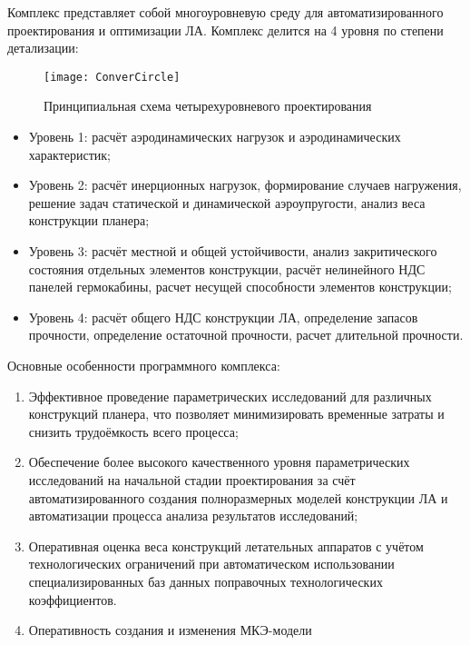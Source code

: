 \label{sec:Conver}


Комплекс представляет собой многоуровневую среду для автоматизированного проектирования и оптимизации ЛА. Комплекс делится на 4 уровня по степени детализации:



\begin{figure}[ht]
\centering
\texttt{[image: ConverCircle]} 
\caption{Принципиальная схема четырехуровневого проектирования}
\end{figure}



\begin{itemize}
\item Уровень 1: расчёт аэродинамических нагрузок и аэродинамических характеристик; 
\item Уровень 2: расчёт инерционных нагрузок, формирование случаев нагружения, решение задач статической и динамической аэроупругости, анализ веса конструкции планера;
\item Уровень 3: расчёт местной и общей устойчивости, анализ закритического состояния отдельных элементов конструкции, расчёт нелинейного НДС панелей гермокабины, расчет несущей способности элементов конструкции;
\item Уровень 4: расчёт общего НДС конструкции ЛА, определение запасов прочности, определение остаточной прочности, расчет длительной прочности.
\end{itemize}

Основные особенности программного комплекса:

\begin{enumerate}
\item Эффективное проведение параметрических исследований для различных конструкций планера, что позволяет минимизировать временные затраты и снизить трудоёмкость всего процесса;
\item Обеспечение более высокого качественного уровня параметрических исследований на начальной стадии проектирования за счёт автоматизированного создания полноразмерных моделей конструкции ЛА и автоматизации процесса анализа результатов исследований;
\item Оперативная оценка веса конструкций летательных аппаратов с учётом технологических ограничений при автоматическом использовании специализированных баз данных поправочных технологических коэффициентов.
\item Оперативность создания и изменения МКЭ-модели
\end{enumerate}


